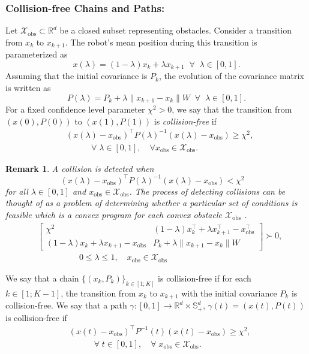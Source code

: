 \documentclass[Afour,sageh,times]{sagej}
\newtheorem{remark}{\bf Remark}
\begin{document}
\subsubsection{Collision-free Chains and Paths:}
Let $\mathcal{X}_{\text{obs}}\subset \mathbb{R}^d$ be a closed subset representing obstacles. 
Consider a transition from $x_k$ to $x_{k+1}$. The robot's mean position during this transition is parameterized as
\[
x(\lambda)=(1-\lambda)x_k+\lambda x_{k+1}\;\;\forall\;\;\lambda\in[0,1].
\]
Assuming that the initial covariance is $P_k$, the evolution of the covariance matrix is written as
\[
P(\lambda)=P_k+\lambda\|x_{k+1}-x_k\|W\;\;\forall\;\;\lambda\in[0,1].
\]
For a fixed confidence level parameter $\chi^2>0$, we say that the transition from $(x(0), P(0))$ to $(x(1), P(1))$ is \emph{collision-free} if
\begin{align} \nonumber
&(x(\lambda)-x_{\text{obs}})^\top P(\lambda)^{-1}(x(\lambda)-x_{\text{obs}}) \geq \chi^2,\\
&\quad \quad \quad \forall\; \lambda\in [0,1], \quad \forall x_{\text{obs}}\in \mathcal{X}_{\text{obs}}.\nonumber
\end{align}
\begin{remark}
\normalfont A collision is detected when 
\begin{equation}
(x(\lambda)-x_{\text{obs}})^\top P(\lambda)^{-1}(x(\lambda)-x_{\text{obs}}) < \chi^2\quad\nonumber
\end{equation}
for all $ \lambda\in [0,1]$ and $x_{\text{obs}}\in \mathcal{X}_{\text{obs}}$. The process of detecting collisions can be thought of as a problem of determining whether a particular set of conditions is feasible which is a convex program for each convex obstacle $\mathcal{X}_{\text{obs}}$ \cite{pedram2021gaussian}.
\begin{align} 
\nonumber
&\begin{bmatrix}
\chi^2 &  (1\!-\!\lambda)x_k^\top\!+\!\lambda x_{k+1}^\top\!-\!x_{\text{obs}}^\top \\
(1\!-\!\lambda)x_k\!+\!\lambda x_{k+1}\!-\!x_{\text{obs}} & P_k+\lambda\|x_{k+1}-x_k\|W
\end{bmatrix}\succ 0,\\ \label{eq:col_free}
& \quad \quad \quad \quad \quad   0\leq \lambda \leq 1,  \quad x_{\text{obs}}\in \mathcal{X}_{\text{obs}} 
\end{align}
\label{remark:collision_free}
\end{remark}
We say that a chain $\{(x_k, P_k)\}_{k\in[1;K]}$ is {collision-free} if for each $k\in[1;K-1]$, the transition from $x_k$ to $x_{k+1}$ with the initial covariance $P_k$ is collision-free. We say that a path $\gamma: [0,1]\rightarrow \mathbb{R}^d\times \mathbb{S}_{+}^d$, $\gamma(t)=(x(t), P(t))$ is {collision-free} if
\begin{align} \nonumber
&(x(t)-x_{\text{obs}})^\top P^{-1}(t)(x(t)-x_{\text{obs}}) \geq \chi^2,\\
& \quad \quad \quad \forall\; t\in [0, 1], \quad \forall\; x_{\text{obs}}\in \mathcal{X}_{\text{obs}}.
\end{align}
\end{document}
